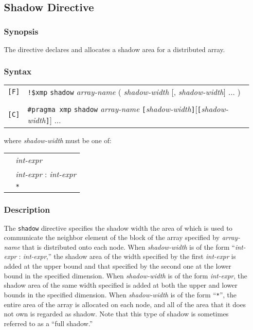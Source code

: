 \subsection{Shadow Directive}
\subsubsection*{Synopsis}

The {\tt {}} directive declares and allocates a shadow
area for a distributed array.

\subsubsection*{Syntax}

\begin{tabular}{ll}
\verb![F]! & \verb|!$xmp| {\tt shadow} {\it array-name}
( {\it shadow-width} [, {\it shadow-width}] ... ) \\
& \\
\verb![C]! & \verb|#pragma xmp|  {\tt shadow} {\it array-name}
{\tt [}{\it shadow-width}{\tt ]}[{\tt [}{\it shadow-width}{\tt ]}] ... \\
\end{tabular}
\vspace{0.3cm}

where {\it shadow-width} must be one of:

\begin{tabular}{ll}
 \hspace{0.5cm} & {\it int-expr} \\
 & {\it int-expr} : {\it int-expr}\\
 & \verb|*|\\
\end{tabular}

\subsubsection*{Description}

The {\tt shadow} directive specifies the shadow width the area of which
is used to communicate the neighbor element of the block of the array
specified by {\it array-name} that is distributed onto each node.
%
When {\it shadow-width} is of the form ``{\it int-expr} : {\it
int-expr},'' the shadow area of the width specified by the first {\it
int-expr} is added at the upper bound and that specified by the second
one at the lower bound in the specified dimension.
%
When {\it shadow-width} is of the form {\it int-expr}, the shadow
area of the same width specified is added at both the upper and lower
bounds in the specified dimension.
%
When {\it shadow-width} is of the form ``\verb|*|'', the entire area of
the array is allocated on each node, and all of the area that it does not
own is regarded as shadow.
%
Note that this type of shadow is sometimes referred to as a ``full
shadow.''

